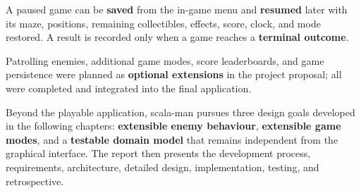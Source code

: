 A paused game can be \textbf{saved} from the in-game menu and \textbf{resumed} later with its maze, positions, remaining collectibles,
effects, score, clock, and mode restored. A result is recorded only when a game reaches a \textbf{terminal outcome}.

Patrolling enemies, additional game modes, score leaderboards, and game persistence were planned as
\textbf{optional extensions} in the project proposal; all were completed and integrated into the final application.

Beyond the playable application, scala-man pursues three design goals developed in the following chapters:
\textbf{extensible enemy behaviour}, \textbf{extensible game modes}, and a \textbf{testable domain model}
that remains independent from the graphical interface. The report then presents the development process,
requirements, architecture, detailed design, implementation, testing, and retrospective.
